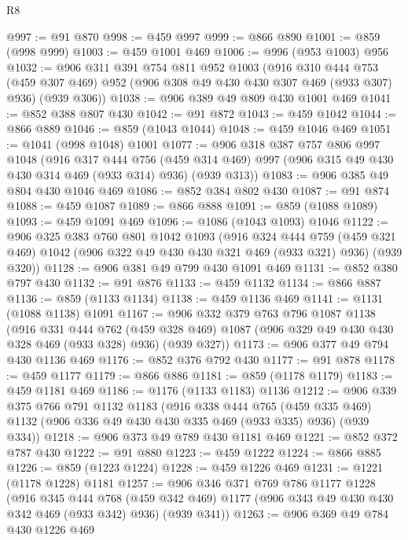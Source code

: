 \begin{lexlean}{R8}
\begin{coremodule}
{{{{{{{{{{{{{{{{{@997 := @91 @870
@998 := @459 @997
@999 := @866 @890
@1001 := @859 (@998 @999)
@1003 := @459 @1001 @469
@1006 := @996 (@953 @1003) @956
@1032 := @906
    @311
    @391
    @754
    @811
    @952
    @1003
    (@916
      @310
      @444
      @753
      (@459 @307 @469)
      @952
      (@906 @308 @49 @430 @430 @307 @469 (@933 @307) @936)
      (@939 @306))
@1038 := @906 @389 @49 @809 @430 @1001 @469
@1041 := @852 @388 @807 @430
@1042 := @91 @872
@1043 := @459 @1042
@1044 := @866 @889
@1046 := @859 (@1043 @1044)
@1048 := @459 @1046 @469
@1051 := @1041 (@998 @1048) @1001
@1077 := @906
    @318
    @387
    @757
    @806
    @997
    @1048
    (@916
      @317
      @444
      @756
      (@459 @314 @469)
      @997
      (@906 @315 @49 @430 @430 @314 @469 (@933 @314) @936)
      (@939 @313))
@1083 := @906 @385 @49 @804 @430 @1046 @469
@1086 := @852 @384 @802 @430
@1087 := @91 @874
@1088 := @459 @1087
@1089 := @866 @888
@1091 := @859 (@1088 @1089)
@1093 := @459 @1091 @469
@1096 := @1086 (@1043 @1093) @1046
@1122 := @906
    @325
    @383
    @760
    @801
    @1042
    @1093
    (@916
      @324
      @444
      @759
      (@459 @321 @469)
      @1042
      (@906 @322 @49 @430 @430 @321 @469 (@933 @321) @936)
      (@939 @320))
@1128 := @906 @381 @49 @799 @430 @1091 @469
@1131 := @852 @380 @797 @430
@1132 := @91 @876
@1133 := @459 @1132
@1134 := @866 @887
@1136 := @859 (@1133 @1134)
@1138 := @459 @1136 @469
@1141 := @1131 (@1088 @1138) @1091
@1167 := @906
    @332
    @379
    @763
    @796
    @1087
    @1138
    (@916
      @331
      @444
      @762
      (@459 @328 @469)
      @1087
      (@906 @329 @49 @430 @430 @328 @469 (@933 @328) @936)
      (@939 @327))
@1173 := @906 @377 @49 @794 @430 @1136 @469
@1176 := @852 @376 @792 @430
@1177 := @91 @878
@1178 := @459 @1177
@1179 := @866 @886
@1181 := @859 (@1178 @1179)
@1183 := @459 @1181 @469
@1186 := @1176 (@1133 @1183) @1136
@1212 := @906
    @339
    @375
    @766
    @791
    @1132
    @1183
    (@916
      @338
      @444
      @765
      (@459 @335 @469)
      @1132
      (@906 @336 @49 @430 @430 @335 @469 (@933 @335) @936)
      (@939 @334))
@1218 := @906 @373 @49 @789 @430 @1181 @469
@1221 := @852 @372 @787 @430
@1222 := @91 @880
@1223 := @459 @1222
@1224 := @866 @885
@1226 := @859 (@1223 @1224)
@1228 := @459 @1226 @469
@1231 := @1221 (@1178 @1228) @1181
@1257 := @906
    @346
    @371
    @769
    @786
    @1177
    @1228
    (@916
      @345
      @444
      @768
      (@459 @342 @469)
      @1177
      (@906 @343 @49 @430 @430 @342 @469 (@933 @342) @936)
      (@939 @341))
@1263 := @906 @369 @49 @784 @430 @1226 @469
}}}}}}}}}}}}}}}}}
\end{coremodule}
\end{lexlean}
